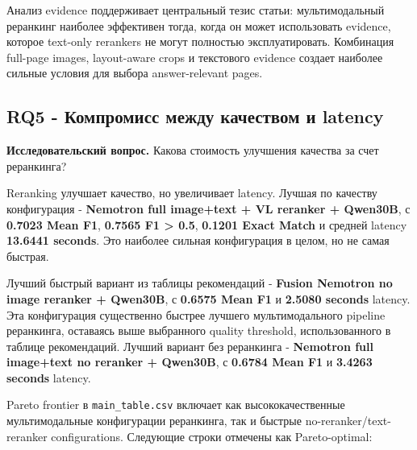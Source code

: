 \documentclass[conference]{IEEEtran}
\begin{document}
Анализ evidence поддерживает центральный тезис статьи: мультимодальный реранкинг наиболее эффективен тогда, когда он может использовать evidence, которое text-only rerankers не могут полностью эксплуатировать. Комбинация full-page images, layout-aware crops и текстового evidence создает наиболее сильные условия для выбора answer-relevant pages.

\subsection{RQ5 - Компромисс между качеством и latency}

\textbf{Исследовательский вопрос.} Какова стоимость улучшения качества за счет реранкинга?

Reranking улучшает качество, но увеличивает latency. Лучшая по качеству конфигурация - \textbf{Nemotron full image+text + VL reranker + Qwen30B}, с \textbf{0.7023 Mean F1}, \textbf{0.7565 F1 > 0.5}, \textbf{0.1201 Exact Match} и средней latency \textbf{13.6441 seconds}. Это наиболее сильная конфигурация в целом, но не самая быстрая.

Лучший быстрый вариант из таблицы рекомендаций - \textbf{Fusion Nemotron no image reranker + Qwen30B}, с \textbf{0.6575 Mean F1} и \textbf{2.5080 seconds} latency. Эта конфигурация существенно быстрее лучшего мультимодального pipeline реранкинга, оставаясь выше выбранного quality threshold, использованного в таблице рекомендаций. Лучший вариант без реранкинга - \textbf{Nemotron full image+text no reranker + Qwen30B}, с \textbf{0.6784 Mean F1} и \textbf{3.4263 seconds} latency.

Pareto frontier в \texttt{main\_table.csv} включает как высококачественные мультимодальные конфигурации реранкинга, так и быстрые no-reranker/text-reranker configurations. Следующие строки отмечены как Pareto-optimal:
\end{document}
